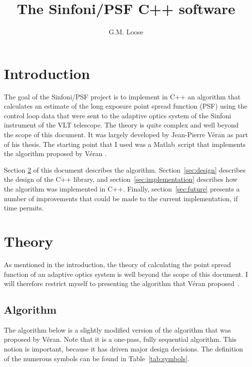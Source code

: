 \documentclass[a4paper]{article}
\begin{document}
\title{The Sinfoni/PSF C++ software}
\author{G.M. Loose}
\maketitle

\newcommand{\ASCII}{{\sc ascii}}
\newcommand{\FITS}{{\sc fits}}
\newcommand{\WFS}{{\sc wfs}}
\newcommand{\registered}{\textsuperscript{\textregistered}}
\newcommand{\Matlab}{{\sc Matlab}}
\renewcommand{\thefootnote}{\fnsymbol{footnote}}



\section{Introduction}
The goal of the Sinfoni/PSF project is to implement in C++ an algorithm that
calculates an estimate of the long exposure point spread function (PSF) using
the control loop data that were sent to the adaptive optics system of the
Sinfoni instrument of the VLT telescope. The theory is quite complex and well
beyond the scope of this document. It was largely developed by Jean-Pierre
V\'eran as part of his thesis. The starting point that I used was a
\Matlab\registered{}ript that implements the algorithm proposed by V\'eran
\cite{veran}. 

Section \ref{sec:theory} of this document describes the
algorithm. Section~\ref{sec:design} describes the design of the C++ library,
and section~\ref{sec:implementation} describes how the algorithm was
implemented in C++. Finally, section~\ref{sec:future} presents a number of
improvements that could be made to the current implementation, if time
permits.



\section{Theory}
\label{sec:theory}
As mentioned in the introduction, the theory of calculating the point spread
function of an adaptive optics system is well beyond the scope of this
document. I will therefore restrict myself to presenting the algorithm
that V\'eran proposed~\cite{veran}.


\subsection{Algorithm}
\label{subsec:algorithm}
The algorithm below is a slightly modified version of the algorithm that was
proposed by V\'eran. Note that it is a one-pass, fully sequential
algorithm. This notion is important, because it has driven major design
decisions. The definition of the numerous symbols can be found in
Table~\ref{tab:symbols}.
\end{document}
